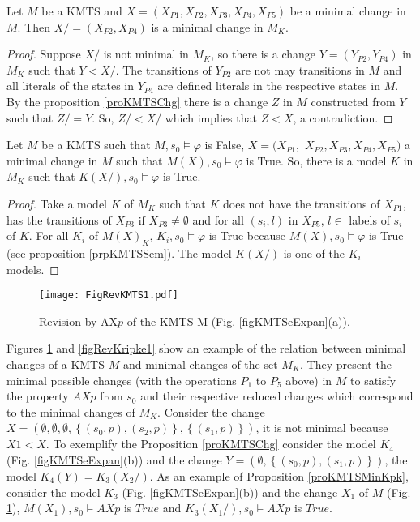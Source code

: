 \documentclass{llncs}
\begin{document}
\begin{proposition} \label{proKMTSMin}
Let $M$ be a KMTS and $X = (X_{P1},X_{P2},X_{P3},X_{P4},X_{P5})$ be a minimal change in $M$. Then $X/ =(X_{P2},X_{P4})$ is a minimal change in $M_{K}$.
\begin{proof}
Suppose $X/$ is not minimal in $M_{K}$, so there is a change $Y = (Y_{P2}, Y_{P4})$ in $M_{K}$ such that $Y < X/$. The transitions of $Y_{P2}$ are not may transitions in $M$ and all literals of the states in $Y_{P4}$ are defined literals in the respective states in $M$. By the proposition \ref{proKMTSChg} there is a change $Z$ in $M$ constructed from $Y$ such that $Z/ = Y$. So, $Z/ < X/$ which implies that $Z < X$, a contradiction. 
\end{proof}
\end{proposition}

\begin{proposition} \label{proKMTSMinKpk}
Let $M$ be a KMTS such that $M,s_{0} \models \varphi$ is False, $X = (X_{P1}, $ $X_{P2}, X_{P3}, X_{P4}, X_{P5})$ a minimal change in $M$ such that $M(X),s_{0} \models \varphi$ is True. So, there is a model $K$ in $M_{K}$ such that $K(X/),s_{0} \models \varphi$ is True. 
\begin{proof}
Take a model $K$ of $M_{K}$ such that $K$ does not have the transitions of $X_{P1}$, has the transitions of $X_{P3}$ if $X_{P3} \neq \emptyset$  and for all $(s_{i},l)$ in $X_{P5}$, $l \in$ labels of $s_{i}$ of $K$. For all $K_{i}$ of $M(X)_{K}$, $K_{i},s_{0} \models \varphi$ is True because $M(X),s_{0} \models \varphi$ is True (see proposition \ref{prpKMTSSem}). The model $K(X/)$ is one of the $K_{i}$ models.
\end{proof}
\end{proposition} 

\vspace*{-0.5cm}
\begin{figure}[h]
\centering
\texttt{[image: FigRevKMTS1.pdf]}
\caption{Revision by AX$p$ of the KMTS M (Fig. \ref{figKMTSeExpan}(a)).}
\label{figRevKMTS1}
\end{figure}
\vspace*{-0.5cm}

Figures \ref{figRevKMTS1} and \ref{figRevKripke1} show an example of the relation between minimal changes of a KMTS $M$ and minimal changes of the set $M_{K}$. They present the minimal possible changes (with the operations $P_{1}$ to $P_{5}$ above) in $M$ to satisfy the property $AXp$ from $s_{0}$ and their respective reduced changes which correspond to the minimal changes of $M_{K}$. Consider the change $X = (\emptyset,\emptyset,\emptyset,\left\{(s_{0},p), (s_{2},p)\right\},\left\{(s_{1},p)\right\})$, it is not minimal because $X1 < X$. To exemplify the Proposition \ref{proKMTSChg} consider the model $K_{4}$ (Fig. \ref{figKMTSeExpan}(b)) and the change $Y = (\emptyset,\left\{(s_{0},p), (s_{1},p)\right\})$, the model $K_{4}(Y) = K_{3}(X_{2}/)$. As an example of Proposition \ref{proKMTSMinKpk}, consider the model $K_{3}$ (Fig. \ref{figKMTSeExpan}(b)) and the change $X_{1}$ of $M$ (Fig. \ref{figRevKMTS1}), $M(X_{1}),s_{0} \models AXp$ is $True$ and $K_{3}(X_{1}/),s_{0} \models AXp$ is $True$.  
\end{document}
